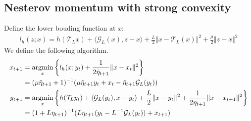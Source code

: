 \documentclass[12pt]{article}
\begin{document}
    \subsection{Nesterov momentum with strong convexity}
        \begin{definition}\label{def:generic_s-cvx_form}
            Define the lower bouding function at $x$: 
            \begin{align*}
                l_h(z; x) = h(\mathcal T_L x) + \langle \mathcal G_L (x), z - x\rangle
                + 
                \frac{L}{2}\Vert x - \mathcal T_L (x)\Vert^2 + \frac{\mu}{2}\Vert z - x\Vert^2
            \end{align*}
            We define the following algorithm. 
            \begin{align*}
                x_{t + 1} &= \mathop{\rm argmin}\limits_{x} \left\lbrace
                    l_h(x; y_t) + \frac{1}{2\tilde \eta_{t + 1}} 
                    \Vert x - x_t\Vert^2 
                \right\rbrace
                \\
                &= (\mu\tilde \eta_{t + 1} + 1)^{-1} 
                (\mu\tilde \eta_{t + 1}y_t + x_t - \tilde \eta_{t + 1}\mathcal G_L(y_t))
                \\
                y_{t + 1}&= 
                \mathop{\rm argmin}\limits_{x}
                \left\lbrace
                    h(\mathcal T_L y_t) + \langle \mathcal G_L(y_t), x - y_t\rangle + \frac{L}{2}\Vert x -y_t\Vert^2
                    + \frac{1}{2\eta_{t + 1}}\Vert x - x_{t + 1}\Vert^2
                \right\rbrace
                \\
                &= (1 + L \eta_{t +1})^{-1}(L\eta_{t + 1}(y_t - L^{-1}\mathcal G_L(y_t)) + x_{t + 1})
            \end{align*}
        \end{definition}
\end{document}
